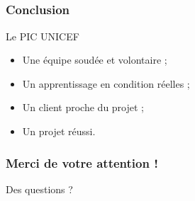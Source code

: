 \speaker{\Pierre}
\subsection*{} %

\begin{frame}
\frametitle{Conclusion}
	\begin{block}{Le PIC UNICEF}
		\begin{itemize}
			\item Une équipe soudée et volontaire ;
			\item Un apprentissage en condition réelles ;
			\item Un client proche du projet ;
			\item Un projet réussi.
		\end{itemize}      
	\end{block}
\end{frame}

\speaker{}
\begin{frame}
	\frametitle{Merci de votre attention !}
	\begin{center}\color{black}
		\Huge{Des questions ?}
	\end{center}
\end{frame}